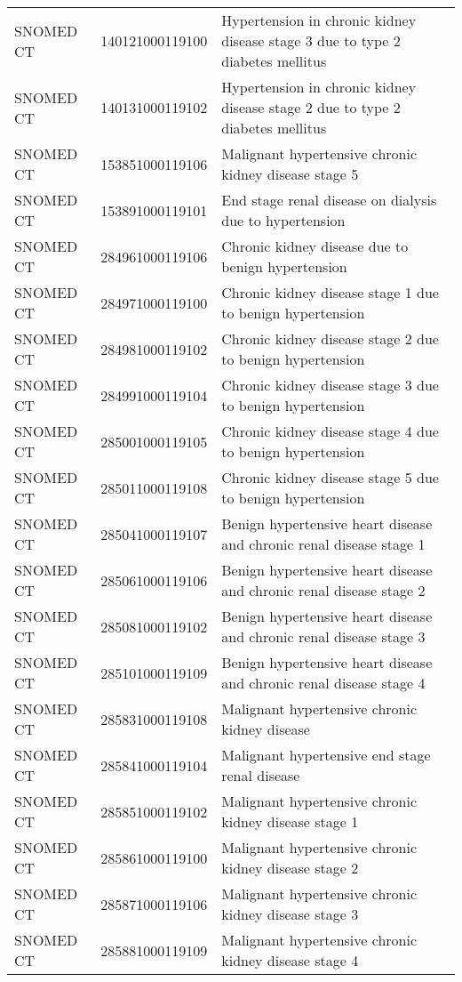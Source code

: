 \begin{longtable}{p{}p{}p{}}
  SNOMED CT & 140121000119100 & Hypertension in chronic kidney disease stage 3 due to type 2 diabetes mellitus \\ 
  SNOMED CT & 140131000119102 & Hypertension in chronic kidney disease stage 2 due to type 2 diabetes mellitus \\ 
  SNOMED CT & 153851000119106 & Malignant hypertensive chronic kidney disease stage 5 \\ 
  SNOMED CT & 153891000119101 & End stage renal disease on dialysis due to hypertension \\ 
  SNOMED CT & 284961000119106 & Chronic kidney disease due to benign hypertension \\ 
  SNOMED CT & 284971000119100 & Chronic kidney disease stage 1 due to benign hypertension \\ 
  SNOMED CT & 284981000119102 & Chronic kidney disease stage 2 due to benign hypertension \\ 
  SNOMED CT & 284991000119104 & Chronic kidney disease stage 3 due to benign hypertension \\ 
  SNOMED CT & 285001000119105 & Chronic kidney disease stage 4 due to benign hypertension \\ 
  SNOMED CT & 285011000119108 & Chronic kidney disease stage 5 due to benign hypertension \\ 
  SNOMED CT & 285041000119107 & Benign hypertensive heart disease and chronic renal disease stage 1 \\ 
  SNOMED CT & 285061000119106 & Benign hypertensive heart disease and chronic renal disease stage 2 \\ 
  SNOMED CT & 285081000119102 & Benign hypertensive heart disease and chronic renal disease stage 3 \\ 
  SNOMED CT & 285101000119109 & Benign hypertensive heart disease and chronic renal disease stage 4 \\ 
  SNOMED CT & 285831000119108 & Malignant hypertensive chronic kidney disease \\ 
  SNOMED CT & 285841000119104 & Malignant hypertensive end stage renal disease \\ 
  SNOMED CT & 285851000119102 & Malignant hypertensive chronic kidney disease stage 1 \\ 
  SNOMED CT & 285861000119100 & Malignant hypertensive chronic kidney disease stage 2 \\ 
  SNOMED CT & 285871000119106 & Malignant hypertensive chronic kidney disease stage 3 \\ 
  SNOMED CT & 285881000119109 & Malignant hypertensive chronic kidney disease stage 4 \\ 

\end{longtable}
